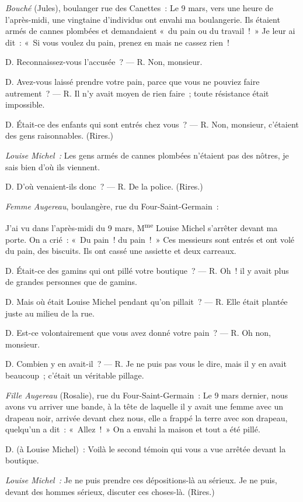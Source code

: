 \documentclass[french,twoside]{book} %
\begin{document}
\noindent \emph{Bouché} (Jules), boulanger rue des Canettes : Le 9 mars, vers une heure de l’après-midi, une vingtaine d’individus ont envahi ma boulangerie. Ils étaient armés de cannes plombées et demandaient « du pain ou du travail ! » Je leur ai dit : « Si vous voulez du pain, prenez en mais ne cassez rien !\par
D. Reconnaissez-vous l’accusée ? — R. Non, monsieur.\par
D. Avez-vous laissé prendre votre pain, parce que vous ne pouviez faire autrement ? — R. Il n’y avait moyen de rien faire ; toute résistance était impossible.\par
D. Était-ce des enfants qui sont entrés chez vous ? — R. Non, monsieur, c’étaient des gens raisonnables. (Rires.)\par
\emph{Louise Michel :} Les gens armés de cannes plombées n’étaient pas des nôtres, je sais bien d’où ils viennent.\par
D. D’où venaient-ils donc ? — R. De la police. (Rires.)\par
\emph{Femme Augereau}, boulangère, rue du Four-Saint-Germain :\par
 J’ai vu dans l’après-midi du 9 mars, M\textsuperscript{me} Louise Michel s’arrêter devant ma porte. On a crié : « Du pain ! du pain ! » Ces messieurs sont entrés et ont volé du pain, des biscuits. Ils ont cassé une assiette et deux carreaux.\par
D. Était-ce des gamins qui ont pillé votre boutique ? — R. Oh ! il y avait plus de grandes personnes que de gamins.\par
D. Mais où était Louise Michel pendant qu’on pillait ? — R. Elle était plantée juste au milieu de la rue.\par
D. Est-ce volontairement que vous avez donné votre pain ? — R. Oh non, monsieur.\par
D. Combien y en avait-il ? — R. Je ne puis pas vous le dire, mais il y en avait beaucoup ; c’était un véritable pillage.\par
\emph{Fille Augereau} (Rosalie), rue du Four-Saint-Germain : Le 9 mars dernier, nous avons vu arriver une bande, à la tête de laquelle il y avait une femme avec un drapeau noir, arrivée devant chez nous, elle a frappé la terre avec son drapeau, quelqu’un a dit : « Allez ! » On a envahi la maison et tout a été pillé.\par
D. (à Louise Michel) : Voilà le second témoin qui vous a vue arrêtée devant la boutique.\par
\emph{Louise Michel :} Je ne puis prendre ces dépositions-là au sérieux. Je ne puis, devant des hommes sérieux, discuter ces choses-là. (Rires.)\par
\end{document}
